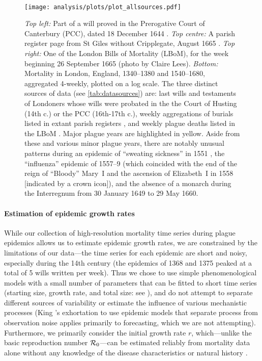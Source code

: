 \begin{figure}
\begin{center}
{%
}
\\ \vspace{0.5cm}
\texttt{[image: analysis/plots/plot\_allsources.pdf]}
\end{center}
\vspace{-0.5cm}
\caption[]{
  \emph{Top left:} Part of a will proved in the Prerogative Court of Canterbury (PCC), dated 18 December 1644 \cite{Archives2018}.
  \emph{Top centre:} A parish register page from St Giles without Cripplegate, August 1665 \cite[courtesy of the Wellcome Collection: \url{https://wellcomecollection.org/works/uutd7scc}]{Bell24}.
  \emph{Top right:} One of the London Bills of Mortality (LBoM), for the week beginning 26 September 1665 (photo by Claire Lees).
\emph{Bottom:}
Mortality in London, England, 1340--1380 and 1540--1680, aggregated 4-weekly, plotted on a log scale.  The three distinct sources of data (see \cref{tab:datasources}) are: 
last wills and testaments of Londoners whose wills were probated in the the Court of Husting (14th c.{}) or the PCC (16th-17th c.{}),
weekly aggregations of burials listed in extant parish registers \cite{Slac90}, 
and weekly plague deaths listed in the LBoM \cite{Crei65}.
Major plague years are highlighted in yellow.  Aside from these and various minor plague years, there are notably unusual patterns during an epidemic of ``sweating sickness'' in 1551 \cite[p.\,70]{Slac90}, the ``influenza'' epidemic of 1557--9 \cite[p.\,70]{Slac90} (which coincided with the end of the reign of ``Bloody'' Mary~I and the ascension of Elizabeth~I in 1558 [indicated by a crown icon]), and the absence of a monarch during the Interregnum from 30 January 1649 to 29 May 1660.
}
\label{F:plot3sources}
\end{figure}
%


\paragraph{Estimation of epidemic growth rates}

While our collection of high-resolution mortality time series during plague epidemics allows us to estimate epidemic growth rates, we are constrained by the limitations of our data---the time series for each epidemic are short and noisy, especially during the 14th century (\eg the epidemics of 1368 and 1375 peaked at a total of 5 wills written per week). Thus we chose to use simple phenomenological models with a small number of parameters that can be fitted to short time series (starting size, growth rate, and total size: see \Methodslink), and do not attempt to separate different sources of variability or estimate the influence of various mechanistic processes (King \etal's exhortation to use epidemic models that separate process from observation noise \cite{King+2015} applies primarily to forecasting, which we are not attempting).
Furthermore, we primarily consider the initial growth rate $r$, which---unlike the basic reproduction number ${\mathcal R}_0$---can be estimated reliably from mortality data alone without any knowledge of the disease characteristics or natural history \cite{Ma+14}.

